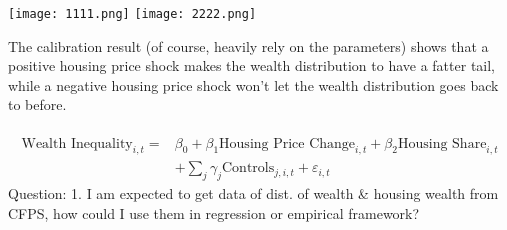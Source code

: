 \documentclass[12pt,letterpaper]{article}
\begin{document}
	\begin{center}
		\texttt{[image: 1111.png]}
		\texttt{[image: 2222.png]}
	\end{center}
	The calibration result (of course, heavily rely on the parameters) shows that a positive housing price shock makes the wealth distribution to have a fatter tail, while a negative housing price shock won't let the wealth distribution goes back to before.\smallskip\\
	\smallskip\\
	\begin{align*}
		\text{Wealth Inequality}_{i,t} = &\beta_0 + \beta_1 \text{Housing Price Change}_{i,t} + \beta_2 \text{Housing Share}_{i,t} \\&+ \sum_{j} \gamma_j \text{Controls}_{j,i,t} + \varepsilon_{i,t}
	\end{align*}
	{\color{red}Question: 1. I am expected to get data of dist. of wealth \& housing wealth from CFPS, how could I use them in regression or empirical framework?}\medskip\\
	

	
	
	
\end{document}
